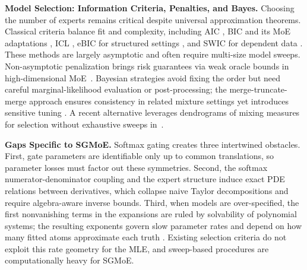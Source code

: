 \documentclass[twoside]{article}
\theoremstyle{plain}
\theoremstyle{definition}
\theoremstyle{plain}
\begin{document}
{\bf Model Selection: Information Criteria, Penalties, and Bayes.}
Choosing the number of experts remains critical despite universal approximation theorems. Classical criteria balance fit and complexity, including AIC \citep{akaike_new_1974,fruhwirth_schnatter_analysing_2018}, BIC and its MoE adaptations \citep{schwarz_estimating_1978,khalili_estimation_2024,forbes_mixture_2022,berrettini_identifying_2024,forbes_summary_2022,nguyen_modifications_2025,ho_unified_2025}, ICL \citep{biernacki_assessing_2000,fruhwirth_schnatter_labor_2012}, eBIC for structured settings \citep{foygel_extended_2010,nguyen_joint_2024}, and SWIC for dependent data \citep{sin_information_1996,nguyen_large_sample_2025,westerhout_asymptotic_2024}. These methods are largely asymptotic and often require multi-size model sweeps. Non-asymptotic penalization brings risk guarantees via weak oracle bounds in high-dimensional MoE~\citep{nguyen_non_asymptotic_2021,nguyen_model_2022,nguyen_non_asymptotic_2022,nguyen_non_asymptotic_2023,montuelle_mixture_2014,nguyen_non_asymptotic_Lasso_2023}. Bayesian strategies avoid fixing the order but need careful marginal-likelihood evaluation or post-processing; the merge-truncate-merge approach ensures consistency in related mixture settings yet introduces sensitive tuning \citep{fruhwirth_schnatter_keeping_2019,zens_bayesian_2019,guha_posterior_2021,nguyen_bayesian_2024_JNPS}. A recent alternative leverages dendrograms of mixing measures for selection without exhaustive sweeps in~\citep{do_dendrogram_2024,thai_model_2025,tran_fast_2026}.

{\bf Gaps Specific to SGMoE.}
Softmax gating creates three intertwined obstacles. First, gate parameters are identifiable only up to common translations, so parameter losses must factor out these symmetries. Second, the softmax numerator-denominator coupling and the expert structure induce exact PDE relations between derivatives, which collapse naive Taylor decompositions and require algebra-aware inverse bounds. Third, when models are over-specified, the first nonvanishing terms in the expansions are ruled by solvability of polynomial systems; the resulting exponents govern slow parameter rates and depend on how many fitted atoms approximate each truth \citep{ho_convergence_2022,nguyen_demystifying_2023}. Existing selection criteria do not exploit this rate geometry for the MLE, and sweep-based procedures are computationally heavy for SGMoE.
\end{document}
